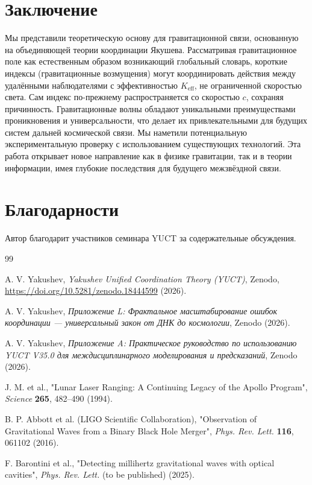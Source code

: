 \documentclass[12pt,a4paper]{article}
\newcommand{\Keff}{K_{\mathrm{eff}}}
\begin{document}
	\section{Заключение}
	\label{sec:conclusion}
	
	Мы представили теоретическую основу для гравитационной связи, основанную на объединяющей теории координации Якушева. Рассматривая гравитационное поле как естественным образом возникающий глобальный словарь, короткие индексы (гравитационные возмущения) могут координировать действия между удалёнными наблюдателями с эффективностью \(\Keff\), не ограниченной скоростью света. Сам индекс по-прежнему распространяется со скоростью \(c\), сохраняя причинность. Гравитационные волны обладают уникальными преимуществами проникновения и универсальности, что делает их привлекательными для будущих систем дальней космической связи. Мы наметили потенциальную экспериментальную проверку с использованием существующих технологий. Эта работа открывает новое направление как в физике гравитации, так и в теории информации, имея глубокие последствия для будущего межзвёздной связи.
	
	\section*{Благодарности}
	
	Автор благодарит участников семинара YUCT за содержательные обсуждения.
	
	\begin{thebibliography}{99}
		
		A. V. Yakushev, \emph{Yakushev Unified Coordination Theory (YUCT)}, Zenodo, \url{https://doi.org/10.5281/zenodo.18444599} (2026).
		
		A. V. Yakushev, \emph{Приложение L: Фрактальное масштабирование ошибок координации — универсальный закон от ДНК до космологии}, Zenodo (2026).
		
		A. V. Yakushev, \emph{Приложение A: Практическое руководство по использованию YUCT V35.0 для междисциплинарного моделирования и предсказаний}, Zenodo (2026).
		
		J. M. et al., "Lunar Laser Ranging: A Continuing Legacy of the Apollo Program", \emph{Science} \textbf{265}, 482–490 (1994).
		
		B. P. Abbott et al. (LIGO Scientific Collaboration), "Observation of Gravitational Waves from a Binary Black Hole Merger", \emph{Phys. Rev. Lett.} \textbf{116}, 061102 (2016).
		
		F. Barontini et al., "Detecting millihertz gravitational waves with optical cavities", \emph{Phys. Rev. Lett.} (to be published) (2025).
		
	\end{thebibliography}
	
\end{document}

